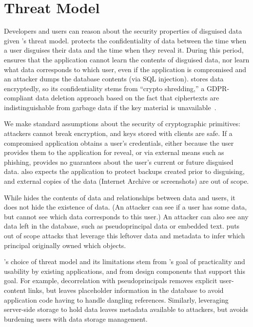 \section{Threat Model}
\label{s:threat}
%
%
%
Developers and users can reason about the security properties of disguised data given \sys's
threat model.
\sys protects the confidentiality of \xxed data between the time when a user
disguises their data and the time when they reveal it.
%
%
During this period, \sys ensures that the application cannot learn the contents of
disguised data, nor learn what \xxed data corresponds to which user, even if the
application is compromised and an attacker dumps the database contents (\eg via
SQL injection).
%
\sys stores \xxed data encryptedly, so its confidentiality stems from ``crypto
shredding,'' a GDPR-compliant data deletion approach based on the fact that
ciphertexts are indistinguishable from garbage data if the key material is
unavailable~\cite{dnefs,townsend:cryptoshredding,aws:cryptoshredding,gtr:cryptoshredding}.
%

%
We make standard assumptions about the security of cryptographic primitives:
attackers cannot break encryption, and keys stored with clients are safe.
%
If a compromised application obtains a user's credentials, either because the
user provides them to the application for reveal, or via external means such as
phishing, \sys provides no guarantees about the user's current or future
disguised data.
%
\sys also expects the application to protect backups created prior to
disguising, and external copies of the data (\eg Internet Archive or
screenshots) are out of scope.
%

%
While \sys hides the contents of \xxed data and relationships between \xxed data
and users, it does not hide the existence of
\xxed data. (An attacker can see if
a user has \xxed some data, but cannot see which \xxed data corresponds to this
user.)
%
An attacker can also see any data left in the database, such as pseudoprincipal
data or embedded text.
%
\sys puts out of scope attacks that leverage this leftover data
and metadata to infer which principal originally owned which objects.
%

\sys's choice of threat model and its limitations stem from
\sys's goal of practicality and usability by existing applications, and
from design components that support this goal.
%
For example, decorrelation with pseudoprincipals removes explicit user-content
links, but leaves placeholder information in the database to avoid application
code having to handle dangling references.
%
Similarly, leveraging server-side storage to hold \xxed data leaves
metadata available to attackers, but avoids burdening users with data storage
management.
